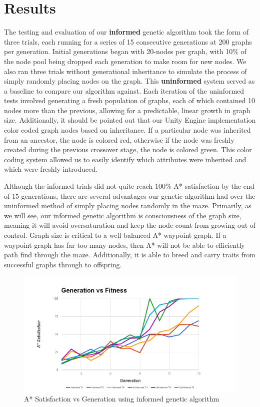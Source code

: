 \section{Results}
	The testing and evaluation of our \textbf{informed} genetic algorithm took the form of three trials, each running for a series of 15 consecutive generations at 200 graphs per generation. Initial generations began with 20-nodes per graph, with 10\% of the node pool being dropped each generation to make room for new nodes. We also ran three trials without generational inheritance to simulate the process of simply randomly placing nodes on the graph. This \textbf{uninformed} system served as a baseline to compare our algorithm against. Each iteration of the uninformed tests involved generating a fresh population of graphs, each of which contained 10 nodes more than the previous, allowing for a predictable, linear growth in graph size. Additionally, it should be pointed out that our Unity Engine implementation color coded graph nodes based on inheritance. If a particular node was inherited from an ancestor, the node is colored red, otherwise if the node was freshly created during the previous crossover stage, the node is colored green. This color coding system allowed us to easily identify which attributes were inherited and which were freshly introduced.
	
	Although the informed trials did not quite reach 100\% A* satisfaction by the end of 15 generations, there are several advantages our genetic algorithm had over the uninformed method of simply placing nodes randomly in the maze. Primarily, as we will see, our informed genetic algorithm is consciousness of the graph size, meaning it will avoid oversaturation and keep the node count from growing out of control. Graph size is critical to a well balanced A* waypoint graph. If a waypoint graph has far too many nodes, then A* will not be able to efficiently path find through the maze. Additionally, it is able to breed and carry traits from successful graphs through to offspring.
	
	\begin{figure}
		\includegraphics[width=1.2\columnwidth]{tests/genfitness}
		\caption{A* Satisfaction vs Generation using informed genetic algorithm}
	\end{figure}
	
